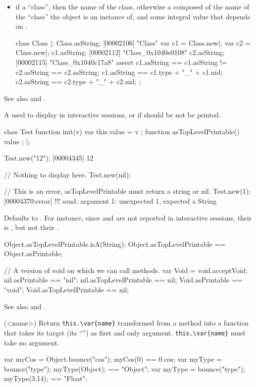 \begin{urbiscriptapi}
\begin{itemize}
\item if \this a ``class'', then the name of the class, otherwise a
   composed of the name of the ``class'' the object is an
  instance of, and some integral value that depends on \this.
\begin{urbiscript}
class Class {}|;
Class.asString;
[00002106] "Class"
var c1 = Class.new|; var c2 = Class.new|;
c1.asString;
[00002112] "Class_0x1040e0108"
c2.asString;
[00002115] "Class_0x1040c17a8"
assert
{
  c1.asString == c1.asString != c2.asString == c2.asString;
  c1.asString == c1.type + "_" + c1.uid;
  c2.asString == c2.type + "_" + c2.uid;
};
\end{urbiscript}
\end{itemize}
  See also  and .


\item[asTopLevelPrintable]%
  A  used to display \this in interactive sessions, or
   if \this should be not be printed.
\begin{urbiscript}
class Test
{
  function init(v) { var this.value = v };
  function asTopLevelPrintable() { value };
}|;

Test.new("12");
[00004345] 12

// Nothing to display here.
Test.new(nil);

// This is an error, asTopLevelPrintable must return a string or nil.
Test.new(1);
[00004370:error] !!! send: argument 1: unexpected 1, expected a String
\end{urbiscript}

  Defaults to .  For instance, since 
  and  are not reported in interactive sessions, their
   is , but not their
  .
\begin{urbiassert}
Object.asTopLevelPrintable.isA(String);
Object.asTopLevelPrintable == Object.asPrintable;

// A version of void on which we can call methods.
var Void = void.acceptVoid;
 nil.asPrintable == "nil";   nil.asTopLevelPrintable == nil;
Void.asPrintable == "void"; Void.asTopLevelPrintable == nil;
\end{urbiassert}

  See also  and .


\item[bounce](<name>)%
  Return \lstinline|this.\var{name}| transformed from a method into a
  function that takes its target (its ``\this'') as first
  and only argument.  \lstinline|this.\var{name}| must take no
  argument.
\begin{urbiassert}
{ var myCos = Object.bounce("cos"); myCos(0) }   == 0.cos;
{ var myType = bounce("type"); myType(Object); } == "Object";
{ var myType = bounce("type"); myType(3.14); }   == "Float";
\end{urbiassert}



\end{urbiscriptapi}
